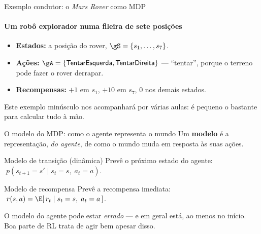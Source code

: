 \documentclass[aspectratio=169, 11pt]{beamer}
\begin{document}
\begin{frame}{Exemplo condutor: o \emph{Mars Rover} como MDP}
  \framesubtitle{Um robô explorador numa fileira de sete posições}
  \begin{center}
  \end{center}

  \begin{itemize}
    \item \textbf{Estados:} a posição do rover, $\gS = \{s_1,\ldots,s_7\}$.
    \item \textbf{Ações:} $\gA = \{\textsf{TentarEsquerda},
          \textsf{TentarDireita}\}$ — ``tentar'', porque o terreno pode
          fazer o rover derrapar.
    \item \textbf{Recompensas:} $+1$ em $s_1$, $+10$ em $s_7$, $0$ nos
          demais estados.
  \end{itemize}

  \medskip
  {\small\color{rlCinza} Este exemplo minúsculo nos acompanhará por várias
  aulas: é pequeno o bastante para calcular tudo à mão.}
\end{frame}

\begin{frame}{O modelo do MDP: como o agente representa o mundo}
  Um \textbf{modelo} é a representação, \emph{do agente}, de como o mundo
  muda em resposta às suas ações.

  \begin{defbox}{Modelo de transição (dinâmica)}
    Prevê o próximo estado do agente:
    $\;p(s_{t+1} = s' \mid s_t = s,\; a_t = a)$.
  \end{defbox}

  \begin{defbox}{Modelo de recompensa}
    Prevê a recompensa imediata:
    $\;r(s, a) = \E[\, r_t \mid s_t = s,\; a_t = a \,]$.
  \end{defbox}

  \begin{alertabox}
    O modelo do agente pode estar \emph{errado} — e em geral está, ao
    menos no início. Boa parte de RL trata de agir bem apesar disso.
  \end{alertabox}
\end{frame}
\end{document}
